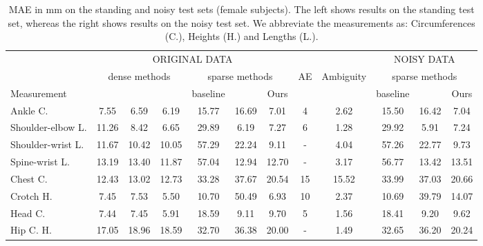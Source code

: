 \begin{table}[t!]
\scriptsize
\begin{center}
\caption{MAE in mm on the standing and noisy test sets (female subjects). The left shows results on the standing test set, whereas the right shows results on the noisy test set. We abbreviate the measurements as: Circumferences (C.), Heights (H.) and Lengths (L.).}
\label{tab:caesar-stand-female-res}
\begin{tabular}{|l|c|c|c|c|c|c|c|c|c|c|c|}
\cline{2-7} \cline{10-12}
  \multicolumn{1}{c|}{}     & \multicolumn{6}{c|}{ORIGINAL DATA}    &    \multicolumn{2}{c|}{} & \multicolumn{3}{c|}{NOISY DATA} \\
\cline{2-12}
      \multicolumn{1}{c|}{}     & \multicolumn{3}{c|}{dense methods}           & \multicolumn{3}{c|}{sparse methods}  &  {\tiny AE} & \multirow{ 2}{*}{\tiny Ambiguity} &  \multicolumn{3}{c|}{sparse methods} \\ 
\cline{1-7}  \cline{10-12}
Measurement              & {\tiny \cite{anthroscan}} & {\tiny \cite{scan-db}} & {\tiny \cite{tsoli-mode-based-anthropometry}} & {\tiny baseline} & {\tiny \cite{bojanic_VISAPP24}} & {\tiny Ours}  & {\tiny \cite{AE}} & & {\tiny baseline} & {\tiny \cite{bojanic_VISAPP24}} & {\tiny Ours} \\ \hline
Ankle C.             & 7.55    & 6.59     & 6.19 & 15.77   & 16.69 & 7.01                 & 4     & 2.62  & 15.50 & 16.42 & 7.04  \\ 
Shoulder-elbow L.    & 11.26   & 8.42     & 6.65 & 29.89   & 6.19 & 7.27                  & 6   & 1.28  &29.92 & 5.91 & 7.24  \\ 
Shoulder-wrist L.    & 11.67   & 10.42    & 10.05 & 57.29   & 22.24 & 9.11                & -  & 4.04  & 57.26 & 22.77 & 9.73  \\ 
Spine-wrist L.       & 13.19   & 13.40    & 11.87 & 57.04   & 12.94 & 12.70               & -   & 3.17   & 56.77 & 13.42 & 13.51  \\ 
Chest C.             & 12.43   & 13.02    & 12.73 & 33.28   & 37.67 & 20.54               & 15    & 15.52   & 33.99 & 37.03 & 20.66 \\  
Crotch H.            & 7.45    & 7.53     & 5.50 & 10.70   & 50.49 & 6.93                 & 10     & 2.37  & 10.69 & 39.79 & 14.07 \\ 
Head C.              & 7.44    & 7.45     & 5.91 & 18.59   & 9.11 & 9.70                  & 5     & 1.56   & 18.41 & 9.20 & 9.62 \\
Hip C. H.            & 17.05   & 18.96    & 18.59 & 32.70   & 36.38 & 20.00               & -    & 1.49   & 32.65 & 36.20 & 20.24 \\  

\end{tabular}
\end{center}
\end{table}
